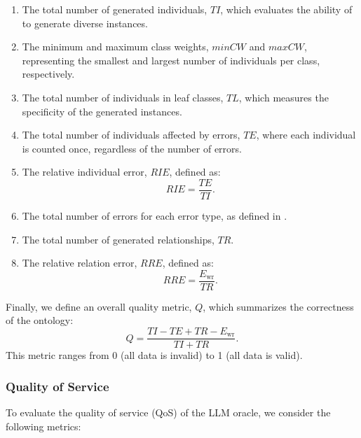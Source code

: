 %
\begin{enumerate}
    \item The total number of generated individuals, \(\mathit{TI}\), which evaluates the ability of \llmfkg{} to generate diverse instances.
    \item The minimum and maximum class weights, \(\mathit{minCW}\) and \(\mathit{maxCW}\), representing the smallest and largest number of individuals per class, respectively.
    \item The total number of individuals in leaf classes, \(\mathit{TL}\), which measures the specificity of the generated instances.
    \item The total number of individuals affected by errors, \(\mathit{TE}\), where each individual is counted once, regardless of the number of errors.
    \item The relative individual error, \(\mathit{RIE}\), defined as:
    \begin{equation}
        \mathit{RIE} = \frac{\mathit{TE}}{\mathit{TI}}.
    \end{equation}
    \item The total number of errors for each error type, as defined in .
    \item The total number of generated relationships, \(\mathit{TR}\).
    \item The relative relation error, \(\mathit{RRE}\), defined as:
    \begin{equation}
        \mathit{RRE} = \frac{E_{\text{wr}}}{\mathit{TR}}.
    \end{equation}
\end{enumerate}

%
Finally, we define an overall quality metric, \(Q\), which summarizes the correctness of the ontology:
%
\begin{equation}
    Q = \frac{\mathit{TI} - \mathit{TE} + \mathit{TR} - E_{\text{wr}}}{\mathit{TI} + \mathit{TR}}.
\end{equation}
%
This metric ranges from 0 (all data is invalid) to 1 (all data is valid).

%
\subsubsection{Quality of Service}

To evaluate the quality of service (QoS) of the \gls{LLM} oracle, we consider the following metrics:

